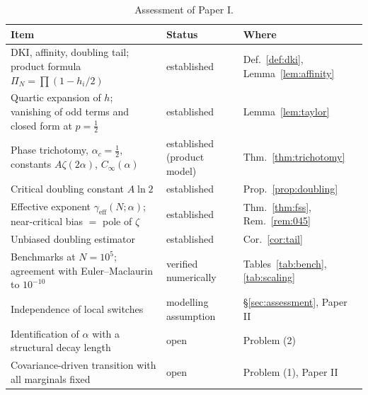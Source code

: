 \documentclass[11pt,reqno]{amsart}
\theoremstyle{plain}
\theoremstyle{definition}
\theoremstyle{remark}
\numberwithin{equation}{section}
\newcommand{\geff}{\gamma_{\mathrm{eff}}}
\begin{document}
\begin{table}[ht]
\centering\small
\caption{Assessment of Paper I.}
\label{tab:assessment}
\begin{tabular}{@{}p{}p{}p{}@{}}
\toprule
Item & Status & Where \\
\midrule
DKI, affinity, doubling tail; product formula $\Pi_N=\prod(1-h_i/2)$ & established & Def.~\ref{def:dki}, Lemma~\ref{lem:affinity} \\
Quartic expansion of $h$; vanishing of odd terms and closed form at $p=\frac12$ & established & Lemma~\ref{lem:taylor} \\
Phase trichotomy, $\alpha_c=\frac12$, constants $A\zeta(2\alpha)$, $C_\infty(\alpha)$ & established (product model) & Thm.~\ref{thm:trichotomy} \\
Critical doubling constant $A\ln2$ & established & Prop.~\ref{prop:doubling} \\
Effective exponent $\geff(N;\alpha)$; near-critical bias $=$ pole of $\zeta$ & established & Thm.~\ref{thm:fss}, Rem.~\ref{rem:045} \\
Unbiased doubling estimator & established & Cor.~\ref{cor:tail} \\
Benchmarks at $N=10^5$; agreement with Euler--Maclaurin to $10^{-10}$ & verified numerically & Tables~\ref{tab:bench}, \ref{tab:scaling} \\
Independence of local switches & modelling assumption & \S\ref{sec:assessment}, Paper II \\
Identification of $\alpha$ with a structural decay length & open & Problem (2) \\
Covariance-driven transition with all marginals fixed & open & Problem (1), Paper II \\
\bottomrule
\end{tabular}
\end{table}
\end{document}
